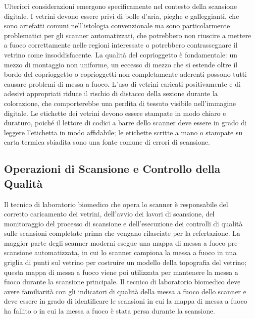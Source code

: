 Ulteriori considerazioni emergono specificamente nel contesto della scansione digitale. I vetrini devono essere privi di bolle d'aria, pieghe e galleggianti, che sono artefatti comuni nell'istologia convenzionale ma sono particolarmente problematici per gli scanner automatizzati, che potrebbero non riuscire a mettere a fuoco correttamente nelle regioni interessate o potrebbero contrassegnare il vetrino come insoddisfacente. La qualità del coprioggetto è fondamentale: un mezzo di montaggio non uniforme, un eccesso di mezzo che si estende oltre il bordo del coprioggetto o coprioggetti non completamente aderenti possono tutti causare problemi di messa a fuoco. L'uso di vetrini caricati positivamente e di adesivi appropriati riduce il rischio di distacco della sezione durante la colorazione, che comporterebbe una perdita di tessuto visibile nell'immagine digitale. Le etichette dei vetrini devono essere stampate in modo chiaro e duraturo, poiché il lettore di codici a barre dello scanner deve essere in grado di leggere l'etichetta in modo affidabile; le etichette scritte a mano o stampate su carta termica sbiadita sono una fonte comune di errori di scansione.

\subsection{Operazioni di Scansione e Controllo della Qualità}

Il tecnico di laboratorio biomedico che opera lo scanner è responsabile del corretto caricamento dei vetrini, dell'avvio dei lavori di scansione, del monitoraggio del processo di scansione e dell'esecuzione dei controlli di qualità sulle scansioni completate prima che vengano rilasciate per la refertazione. La maggior parte degli scanner moderni esegue una mappa di messa a fuoco pre-scansione automatizzata, in cui lo scanner campiona la messa a fuoco in una griglia di punti sul vetrino per costruire un modello della topografia del vetrino; questa mappa di messa a fuoco viene poi utilizzata per mantenere la messa a fuoco durante la scansione principale. Il tecnico di laboratorio biomedico deve avere familiarità con gli indicatori di qualità della messa a fuoco dello scanner e deve essere in grado di identificare le scansioni in cui la mappa di messa a fuoco ha fallito o in cui la messa a fuoco è stata persa durante la scansione.

